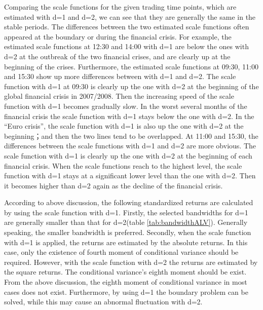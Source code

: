 Comparing the scale functions for the given trading time points, which are estimated with d=1 and d=2, we can see that they are generally the same in the stable periods. The differences between the two estimated scale functions often appeared at the boundary or during the financial crisis. For example, the estimated scale functions at 12:30 and 14:00 with d=1 are below the ones with d=2 at the outbreak of the two financial crises, and are clearly up at the beginning of the crises. 
Furthermore, the estimated scale functions at 09:30, 11:00 and 15:30 show up more differences between with d=1 and d=2. The scale function with d=1 at 09:30 is clearly up the one with d=2 at the beginning of the global financial crisis in 2007/2008. Then the increasing speed of the scale function with d=1 becomes gradually slow. In the worst several months of the financial crisis the scale function with d=1 stays below the one with d=2. In the ``Euro crisis'', the scale function with d=1 is also up the one with d=2 at the beginning；and then the two lines tend to be overlapped. At 11:00 and 15:30, the differences between the scale functions with d=1 and d=2 are more obvious. The scale function with d=1 is clearly up the one with d=2 at the beginning of each financial crisis. When the scale functions reach to the highest level, the scale function with d=1 stays at a significant lower level than the one with d=2. Then it becomes higher than d=2 again as the decline of the financial crisis.

According to above discussion, the following standardized returns are calculated by using the scale function with d=1. Firstly, the selected bandwidths for d=1 are generally smaller than that for d=2(table \ref{tab:bandwidthALV}). Generally speaking, the smaller bandwidth is preferred. Secondly, when the scale function with d=1 is applied, the returns are estimated by the absolute returns. In this case, only the existence of fourth moment of conditional variance should be required. However, with the scale function with d=2 the returns are estimated by the square returns. The conditional variance’s eighth moment should be exist. From the above discussion, the eighth moment of conditional variance in most cases does not exist. Furthermore, by using d=1 the boundary problem can be solved, while this may cause an abnormal fluctuation with d=2.


